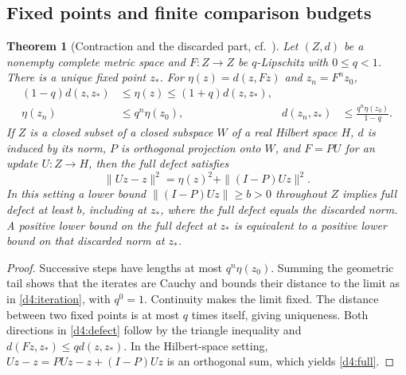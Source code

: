 \documentclass[11pt,reqno]{amsart}
\newtheorem{theorem}{Theorem}[section]
\theoremstyle{definition}
\theoremstyle{remark}
\numberwithin{equation}{section}
\begin{document}
\subsection*{Fixed points and finite comparison budgets}

\begin{theorem}[Contraction and the discarded part, cf.\ \cite{d4-banach}]\label{d4:fixed}
Let \((Z,d)\) be a nonempty complete metric space and \(F:Z\to Z\)
be \(q\)-Lipschitz with \(0\le q<1\). There is a unique fixed point \(z_*\).
For \(\eta(z)=d(z,Fz)\) and \(z_n=F^nz_0\),
\begin{align}
 (1-q)d(z,z_*)&\le \eta(z)\le(1+q)d(z,z_*),\label{d4:defect}\\
 \eta(z_n)&\le q^n\eta(z_0),&
 d(z_n,z_*)&\le\frac{q^n\eta(z_0)}{1-q}.\label{d4:iteration}
\end{align}
If \(Z\) is a closed subset of a closed subspace \(W\) of a real Hilbert
space \(H\), \(d\) is induced by its norm, \(P\) is orthogonal projection
onto \(W\), and \(F=PU\) for an update \(U:Z\to H\),
then the full defect satisfies
\begin{equation}\label{d4:full}
 \|Uz-z\|^2=\eta(z)^2+\|(I-P)Uz\|^2.
\end{equation}
In this setting a lower bound \(\|(I-P)Uz\|\ge b>0\) throughout \(Z\)
implies full defect at least \(b\), including at \(z_*\), where the full
defect equals the discarded norm. A positive lower bound on the full
defect at \(z_*\) is equivalent to a positive lower bound on that
discarded norm at \(z_*\).
\end{theorem}

\begin{proof}
Successive steps have lengths at most \(q^n\eta(z_0)\). Summing the
geometric tail shows that the iterates are Cauchy and bounds their
distance to the limit as in \eqref{d4:iteration}, with \(q^0=1\).
Continuity makes the limit fixed. The distance between two fixed points
is at most \(q\) times itself, giving uniqueness. Both directions in
\eqref{d4:defect} follow by the triangle inequality and
\(d(Fz,z_*)\le qd(z,z_*)\). In the Hilbert-space setting,
\(Uz-z=P Uz-z+(I-P)Uz\) is an orthogonal sum, which yields
\eqref{d4:full}.
\end{proof}
\end{document}
